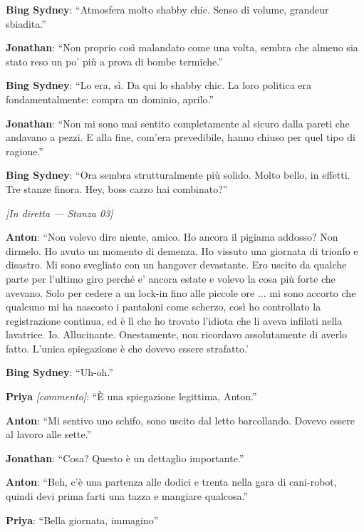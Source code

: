 \noindent\textbf{Bing Sydney}: ``Atmosfera molto shabby chic. Senso di volume, grandeur sbiadita.''

\noindent\textbf{Jonathan}: ``Non proprio così malandato come una volta, sembra che almeno sia stato reso un po' più a prova di bombe termiche.''

\noindent\textbf{Bing Sydney}: ``Lo era, sì. Da qui lo shabby chic. La loro politica era fondamentalmente: compra un dominio, aprilo.''

\noindent\textbf{Jonathan}: ``Non mi sono mai sentito completamente al sicuro dalla pareti che andavano a pezzi. E alla fine, com'era prevedibile, hanno chiuso per quel tipo di ragione.''

\noindent\textbf{Bing Sydney}: ``Ora sembra strutturalmente più solido. Molto bello, in effetti. Tre stanze finora. Hey, boss cazzo hai combinato?''

\medskip
\begin{center}
{\small\sffamily\color{nullmesh-ghost}\textit{[In diretta --- Stanza 03]}}
\end{center}
\medskip

\noindent\textbf{Anton}: ``Non volevo dire niente, amico. Ho ancora il pigiama addosso? Non dirmelo. Ho avuto un momento di demenza. Ho vissuto una giornata di trionfo e disastro. Mi sono svegliato con un hangover devastante. Ero uscito da qualche parte per l'ultimo giro perché e' ancora estate e volevo la cosa più forte che avevano. Solo per cedere a un lock-in fino alle piccole ore ...  mi sono accorto che qualcuno mi ha nascosto i pantaloni come scherzo, così ho controllato la registrazione continua, ed è lì che ho trovato l'idiota che li aveva infilati nella lavatrice. Io. Allucinante. Onestamente, non ricordavo assolutamente di averlo fatto. L'unica spiegazione è che dovevo essere strafatto.'

\noindent\textbf{Bing Sydney}: ``Uh-oh.''

\noindent\textbf{Priya} \textit{[commento]}: ``È una spiegazione legittima, Anton.''

\noindent\textbf{Anton}: ``Mi sentivo uno schifo, sono uscito dal letto barcollando. Dovevo essere al lavoro alle sette.''

\noindent\textbf{Jonathan}: ``Cosa? Questo è un dettaglio importante.''

\noindent\textbf{Anton}: ``Beh, c'è una partenza alle dodici e trenta nella gara di cani-robot, quindi devi prima farti una tazza e mangiare qualcosa.''

\noindent\textbf{Priya}: ``Bella giornata, immagino''

